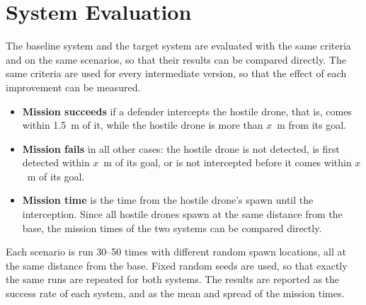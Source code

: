 \section{System Evaluation}\label{sec:evaluation}
The baseline system and the target system are evaluated with the same
criteria and on the same scenarios, so that their results can be compared
directly. The same criteria are used for every intermediate version, so
that the effect of each improvement can be measured.

\begin{itemize}
    \item \textbf{Mission succeeds} if a defender intercepts the hostile
          drone, that is, comes within 1.5~m of it, while the hostile drone
          is more than $x$~m from its goal.
    \item \textbf{Mission fails} in all other cases: the hostile drone is
          not detected, is first detected within $x$~m of its goal, or is
          not intercepted before it comes within $x$~m of its goal.
    \item \textbf{Mission time} is the time from the hostile drone's spawn
          until the interception. Since all hostile drones spawn at the same
          distance from the base, the mission times of the two systems can
          be compared directly.
\end{itemize}

Each scenario is run 30--50 times with different random spawn locations, all
at the same distance from the base. Fixed random seeds are used, so that
exactly the same runs are repeated for both systems. The results are
reported as the success rate of each system, and as the mean and spread of
the mission times.
